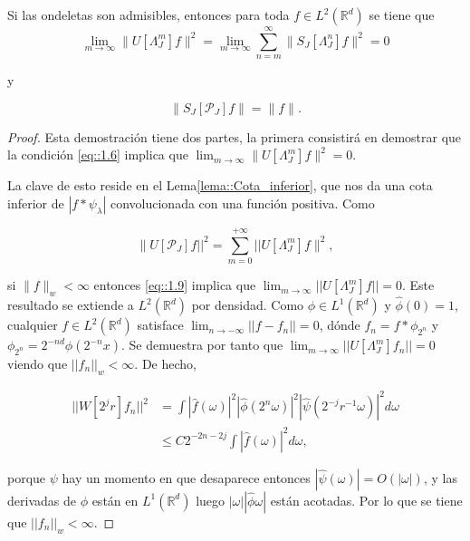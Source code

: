 \begin{teorema} \label{teoremaOndeletasAdmisibles}
\noindent Si las ondeletas son admisibles, entonces para toda $f\in L^2(\mathbb{R}^d)$ se tiene que
\begin{equation}  
  \lim_{m\rightarrow\infty} \|U[\Lambda_J^m]f \|^2=\lim_{m\rightarrow\infty} \sum_{n=m}^{\infty} \|S_J[\Lambda_J^n]f\|^2=0
\end{equation}

y

\begin{equation}
  \|S_J[\mathcal{P}_J]f\|=\|f\|.
\end{equation}

\end{teorema}

\begin{proof}
  Esta demostración tiene dos partes, la primera consistirá en demostrar que la condición \eqref{eq::1.6} implica que $\lim_{m\rightarrow \infty} \| U[\Lambda_J^m]f \|^2=0$. 
  
  \medskip

  \noindent La clave de esto reside en el Lema\ref{lema::Cota_inferior}, que nos da una cota inferior de $|f\ast\psi_\lambda|$ convolucionada con una función positiva. Como 

  $$ \| U[\mathcal{P}_J]f ||^2= \sum_{m=0}^{+\infty} ||U[\Lambda_J^m]f\|^2,$$

  \noindent si $\|f\|_w < \infty$ entonces \eqref{eq::1.9} implica que $\lim_{m\rightarrow\infty}||U[\Lambda_J^m]f||= 0$. Este resultado se extiende a $L^2(\mathbb{R}^d)$ por densidad. Como $\phi \in L^1(\mathbb{R}^d)$ y $\widehat{\phi}(0)=1$, cualquier $f\in L^2(\mathbb{R}^d)$ satisface $\lim_{n\rightarrow - \infty} ||f-f_n||=0$, dónde $f_n=f \ast \phi_{2^n}$ y $\phi_{2^n}=2^{-nd} \phi(2^{-n}x)$. Se demuestra por tanto que $\lim_{m\rightarrow \infty} ||U[\Lambda_J^m]f_n||=0$ viendo que $||f_n||_w < \infty$. De hecho, 


  \begin{align*}
      ||W[2^jr]f_n||^2 &= \int |\widehat{f}(\omega)|^2 |\widehat{\phi}(2^n \omega)|^2 |\widehat{\psi}(2^{-j}r^{-1}\omega)|^2 d\omega \\
      &\leq C 2^{-2n-2j} \int |\widehat{f}(\omega)|^2 d\omega,
  \end{align*}

  \noindent porque $\psi$ hay un momento en que desaparece entonces $|\widehat{\psi}(\omega)|=O(|\omega|)$, y las derivadas de $\phi$ están en $L^1(\mathbb{R}^d)$ luego $|\omega||\widehat{\phi}\omega|$ están acotadas. Por lo que se tiene que $||f_n||_w < \infty$.


\end{proof}
